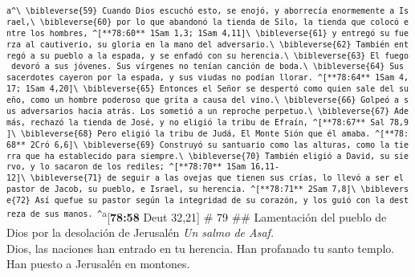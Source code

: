 \textsuperscript{\texttt{a\^{}\textbackslash{}\ \textbackslash{}bibleverse\{59\}\ Cuando\ Dios\ escuchó\ esto,\ se\ enojó,\ y\ aborrecía\ enormemente\ a\ Israel,\textbackslash{}\ \textbackslash{}bibleverse\{60\}\ por\ lo\ que\ abandonó\ la\ tienda\ de\ Silo,\ la\ tienda\ que\ colocó\ entre\ los\ hombres,\ \^{}{[}**78:60**\ 1Sam\ 1,3;\ 1Sam\ 4,11{]}\textbackslash{}\ \textbackslash{}bibleverse\{61\}\ y\ entregó\ su\ fuerza\ al\ cautiverio,\ su\ gloria\ en\ la\ mano\ del\ adversario.\textbackslash{}\ \textbackslash{}bibleverse\{62\}\ También\ entregó\ a\ su\ pueblo\ a\ la\ espada,\ y\ se\ enfadó\ con\ su\ herencia.\textbackslash{}\ \textbackslash{}bibleverse\{63\}\ El\ fuego\ devoró\ a\ sus\ jóvenes.\ Sus\ vírgenes\ no\ tenían\ canción\ de\ boda.\textbackslash{}\ \textbackslash{}bibleverse\{64\}\ Sus\ sacerdotes\ cayeron\ por\ la\ espada,\ y\ sus\ viudas\ no\ podían\ llorar.\ \^{}{[}**78:64**\ 1Sam\ 4,17;\ 1Sam\ 4,20{]}\textbackslash{}\ \textbackslash{}bibleverse\{65\}\ Entonces\ el\ Señor\ se\ despertó\ como\ quien\ sale\ del\ sueño,\ como\ un\ hombre\ poderoso\ que\ grita\ a\ causa\ del\ vino.\textbackslash{}\ \textbackslash{}bibleverse\{66\}\ Golpeó\ a\ sus\ adversarios\ hacia\ atrás.\ Los\ sometió\ a\ un\ reproche\ perpetuo.\textbackslash{}\ \textbackslash{}bibleverse\{67\}\ Además,\ rechazó\ la\ tienda\ de\ José,\ y\ no\ eligió\ la\ tribu\ de\ Efraín,\ \^{}{[}**78:67**\ Sal\ 78,9{]}\textbackslash{}\ \textbackslash{}bibleverse\{68\}\ Pero\ eligió\ la\ tribu\ de\ Judá,\ El\ Monte\ Sión\ que\ él\ amaba.\ \^{}{[}**78:68**\ 2Cró\ 6,6{]}\textbackslash{}\ \textbackslash{}bibleverse\{69\}\ Construyó\ su\ santuario\ como\ las\ alturas,\ como\ la\ tierra\ que\ ha\ establecido\ para\ siempre.\textbackslash{}\ \textbackslash{}bibleverse\{70\}\ También\ eligió\ a\ David,\ su\ siervo,\ y\ lo\ sacaron\ de\ los\ rediles;\ \^{}{[}**78:70**\ 1Sam\ 16,11-12{]}\textbackslash{}\ \textbackslash{}bibleverse\{71\}\ de\ seguir\ a\ las\ ovejas\ que\ tienen\ sus\ crías,\ lo\ llevó\ a\ ser\ el\ pastor\ de\ Jacob,\ su\ pueblo,\ e\ Israel,\ su\ herencia.\ \^{}{[}**78:71**\ 2Sam\ 7,8{]}\textbackslash{}\ \textbackslash{}bibleverse\{72\}\ Así\ quefue\ su\ pastor\ según\ la\ integridad\ de\ su\ corazón,\ y\ los\ guió\ con\ la\ destreza\ de\ sus\ manos.\ \^{}}a}{[}\textbf{78:58}
Deut 32,21{]} \# 79 \#\# Lamentación del pueblo de Dios por la
desolación de Jerusalén \emph{Un salmo de Asaf.}\\
 Dios, las naciones han entrado en tu herencia. Han
profanado tu santo templo. Han puesto a Jerusalén en montones.\\
